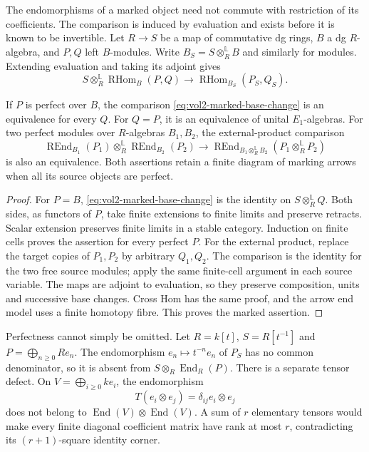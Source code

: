 The endomorphisms of a marked object need not commute with
restriction of its coefficients. The comparison is induced
by evaluation and exists before it is known to be invertible.
Let \(R\to S\) be a map of commutative dg rings, \(B\) a
dg \(R\)-algebra, and \(P,Q\) left \(B\)-modules. Write
\(B_S=S\otimes_R^{\mathbb L}B\) and similarly for modules.
Extending evaluation and taking its adjoint gives
\begin{equation}\label{eq:vol2-marked-base-change}
 S\otimes_R^{\mathbb L}\operatorname{RHom}_B(P,Q)
 \longrightarrow
 \operatorname{RHom}_{B_S}(P_S,Q_S).
\end{equation}

\begin{proposition}\label{prop:vol2-perfect-marked-base-change}
If \(P\) is perfect over \(B\), the comparison
\eqref{eq:vol2-marked-base-change} is an equivalence for
every \(Q\). For \(Q=P\), it is an equivalence of unital
\(E_1\)-algebras. For two perfect modules over
\(R\)-algebras \(B_1,B_2\), the external-product comparison
\[
 \operatorname{REnd}_{B_1}(P_1)
       \otimes_R^{\mathbb L}\operatorname{REnd}_{B_2}(P_2)
 \longrightarrow
 \operatorname{REnd}_{B_1\otimes_R^{\mathbb L}B_2}
                (P_1\otimes_R^{\mathbb L}P_2)
\]
is also an equivalence. Both assertions retain a finite
diagram of marking arrows when all its source objects
are perfect.
\end{proposition}
\begin{proof}
For \(P=B\), \eqref{eq:vol2-marked-base-change} is the
identity on \(S\otimes_R^{\mathbb L}Q\). Both sides, as
functors of \(P\), take finite extensions to finite limits
and preserve retracts. Scalar extension preserves finite
limits in a stable category. Induction on finite cells
proves the assertion for every perfect \(P\).
For the external product, replace the target copies of
\(P_1,P_2\) by arbitrary \(Q_1,Q_2\). The comparison is the
identity for the two free source modules; apply the same
finite-cell argument in each source variable.
The maps are adjoint to evaluation, so they preserve
composition, units and successive base changes. Cross Hom
has the same proof, and the arrow end model uses a finite
homotopy fibre. This proves the marked assertion.
\end{proof}

Perfectness cannot simply be omitted. Let \(R=k[t]\),
\(S=R[t^{-1}]\) and \(P=\bigoplus_{n\ge0}Re_n\).
The endomorphism \(e_n\mapsto t^{-n}e_n\) of \(P_S\)
has no common denominator, so it is absent from
\(S\otimes_R\operatorname{End}_R(P)\).
There is a separate tensor defect. On
\(V=\bigoplus_{i\ge0}ke_i\), the endomorphism
\[
 T(e_i\otimes e_j)=\delta_{ij}e_i\otimes e_j
\]
does not belong to \(\operatorname{End}(V)\otimes
\operatorname{End}(V)\). A sum of \(r\) elementary tensors
would make every finite diagonal coefficient matrix have
rank at most \(r\), contradicting its \((r+1)\)-square
identity corner.

